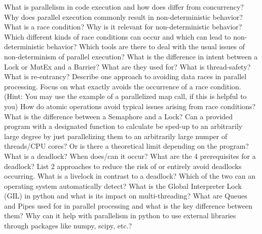 \documentclass[]{erlangen-problemset}
\begin{document}
\begin{problem}[title={Parallelism}]
\noindent
\Question What is parallelism in code execution and how does differ from concurrency?
\Question Why does parallel execution commonly result in non-deterministic behavior?
\Question What is a race condition? Why is it relevant for non-deterministic behavior? Which different kinds of race conditions can occur and which can lead to non-deterministic behavior?
\Question Which tools are there to deal with the usual issues of non-determinism of parallel execution?
\Question What is the difference in intent between a Lock or MutEx and a Barrier? What are they used for?
\Question What is thread-safety? What is re-entrancy? 
\Question Describe one approach to avoiding data races in parallel processing. Focus on what exactly avoids the occurrence of a race condition. (Hint: You may use the example of a parallelized map call, if this is helpful to you)
\Question How do atomic operations avoid typical issues arising from race conditions?
\Question What is the difference between a Semaphore and a Lock?
\Question Can a provided program with a designated function to calculate be sped-up to an arbitrarily large degree by just parallelizing them to an arbitrarily large numper of threads/CPU cores? Or is there a theoretical limit depending on the program?
\Question What is a deadlock? When does/can it occur? What are the 4 prerequisites for a deadlock? List 2 approaches to reduce the risk of or entirely avoid deadlocks occurring.
\Question What is a livelock in contrast to a deadlock? Which of the two can an operating system automatically detect?
\Question What is the Global Interpreter Lock (GIL) in python and what is its impact on multi-threading?
\Question What are Queues and Pipes used for in parallel processing and what is the key difference between them?
\Question Why can it help with parallelism in python to use external libraries through packages like numpy, scipy, etc.?
\end{problem}
\end{document}
